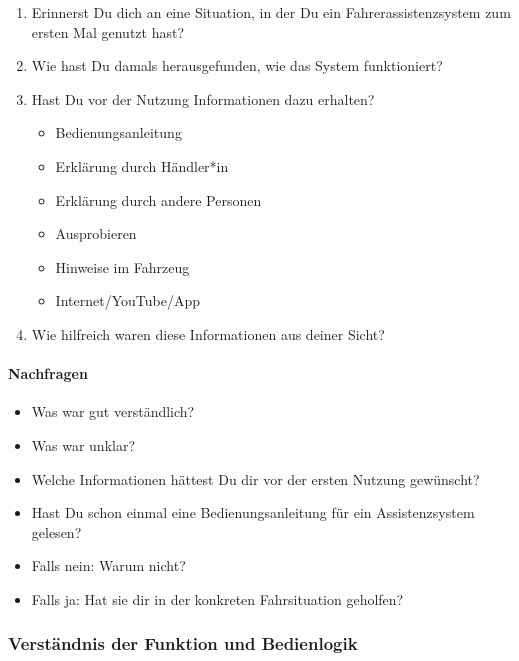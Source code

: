 \begin{enumerate}
    \item Erinnerst Du dich an eine Situation, in der Du ein
          Fahrerassistenzsystem zum ersten Mal genutzt hast?

    \item Wie hast Du damals herausgefunden, wie das System funktioniert?

    \item Hast Du vor der Nutzung Informationen dazu erhalten?

    \begin{itemize}
        \item Bedienungsanleitung
        \item Erklärung durch Händler*in
        \item Erklärung durch andere Personen
        \item Ausprobieren
        \item Hinweise im Fahrzeug
        \item Internet/YouTube/App
    \end{itemize}

    \item Wie hilfreich waren diese Informationen aus deiner Sicht?
\end{enumerate}

\paragraph*{Nachfragen}

\begin{itemize}
    \item Was war gut verständlich?
    \item Was war unklar?
    \item Welche Informationen hättest Du dir vor der ersten Nutzung
          gewünscht?
    \item Hast Du schon einmal eine Bedienungsanleitung für ein
          Assistenzsystem gelesen?
    \item Falls nein: Warum nicht?
    \item Falls ja: Hat sie dir in der konkreten Fahrsituation geholfen?
\end{itemize}


\subsubsection{Verständnis der Funktion und Bedienlogik}

